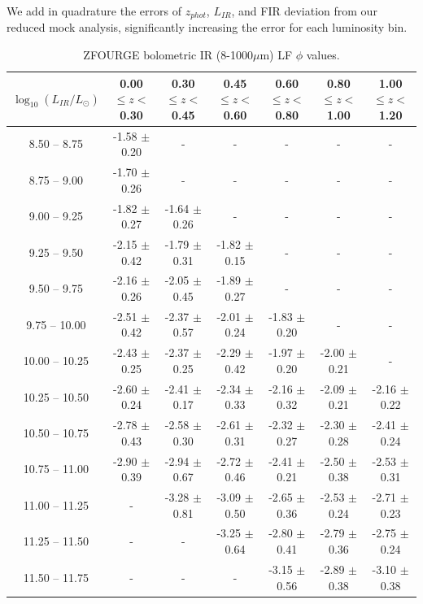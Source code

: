 We add in quadrature the errors of $z_{phot}$, $L_{IR}$, and FIR deviation from our reduced mock analysis, significantly increasing the error for each luminosity bin.

\begin{table}
    \begin{center}
    \caption{ZFOURGE bolometric IR (8-1000$\mu$m) LF $\phi$ values.}
    \label{Tab: ZF LF}
    \begin{tabular}{@{}ccccccc@{}}
        \toprule
        $\log_{10}(L_{IR}/L_{\odot})$ & 0.00 $\leq z <$ 0.30 & 0.30 $\leq z <$ 0.45 & 0.45 $\leq z <$ 0.60 & 0.60 $\leq z <$ 0.80 & 0.80 $\leq z <$ 1.00 & 1.00 $\leq z <$ 1.20 \\
        \hline
         8.50 --  8.75 & -1.58 $\pm$ 0.20 & - & - & - & - & - \\
         8.75 --  9.00 & -1.70 $\pm$ 0.26 & - & - & - & - & - \\
         9.00 --  9.25 & -1.82 $\pm$ 0.27 & -1.64 $\pm$ 0.26 & - & - & - & - \\
         9.25 --  9.50 & -2.15 $\pm$ 0.42 & -1.79 $\pm$ 0.31 & -1.82 $\pm$ 0.15 & - & - & - \\
         9.50 --  9.75 & -2.16 $\pm$ 0.26 & -2.05 $\pm$ 0.45 & -1.89 $\pm$ 0.27 & - & - & - \\
         9.75 -- 10.00 & -2.51 $\pm$ 0.42 & -2.37 $\pm$ 0.57 & -2.01 $\pm$ 0.24 & -1.83 $\pm$ 0.20 & - & - \\
        10.00 -- 10.25 & -2.43 $\pm$ 0.25 & -2.37 $\pm$ 0.25 & -2.29 $\pm$ 0.42 & -1.97 $\pm$ 0.20 & -2.00 $\pm$ 0.21 & - \\
        10.25 -- 10.50 & -2.60 $\pm$ 0.24 & -2.41 $\pm$ 0.17 & -2.34 $\pm$ 0.33 & -2.16 $\pm$ 0.32 & -2.09 $\pm$ 0.21 & -2.16 $\pm$ 0.22 \\
        10.50 -- 10.75 & -2.78 $\pm$ 0.43 & -2.58 $\pm$ 0.30 & -2.61 $\pm$ 0.31 & -2.32 $\pm$ 0.27 & -2.30 $\pm$ 0.28 & -2.41 $\pm$ 0.24 \\
        10.75 -- 11.00 & -2.90 $\pm$ 0.39 & -2.94 $\pm$ 0.67 & -2.72 $\pm$ 0.46 & -2.41 $\pm$ 0.21 & -2.50 $\pm$ 0.38 & -2.53 $\pm$ 0.31 \\
        11.00 -- 11.25 & -                & -3.28 $\pm$ 0.81 & -3.09 $\pm$ 0.50 & -2.65 $\pm$ 0.36 & -2.53 $\pm$ 0.24 & -2.71 $\pm$ 0.23 \\
        11.25 -- 11.50 & -                & -                & -3.25 $\pm$ 0.64 & -2.80 $\pm$ 0.41 & -2.79 $\pm$ 0.36 & -2.75 $\pm$ 0.24 \\
        11.50 -- 11.75 & -                & -                & -                & -3.15 $\pm$ 0.56 & -2.89 $\pm$ 0.38 & -3.10 $\pm$ 0.38 \\

\end{tabular}
\end{center}
\end{table}
